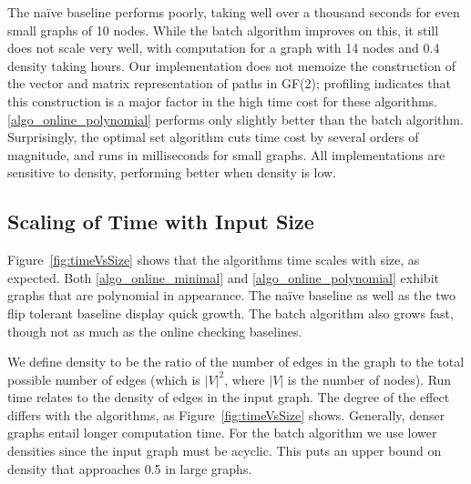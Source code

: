 \documentclass[sigplan,review]{acmart}
\begin{document}
{The na\"{i}ve baseline performs poorly, taking well over a thousand seconds for even small graphs of 10 nodes.
While the batch algorithm improves on this, it still does not scale very well, with computation for a graph with 14 nodes and 0.4 density taking hours.
Our implementation does not memoize the construction of the vector and matrix representation of paths in GF(2); profiling indicates that this construction is a major factor in the high time cost for these algorithms.
\ref{algo_online_polynomial} performs only slightly better than the batch algorithm.
Surprisingly, the optimal set algorithm cuts time cost by several orders of magnitude, and runs in milliseconds for small graphs.
All implementations are sensitive to density, performing better when density is low.
    
\subsection{Scaling of Time with Input Size}

Figure~\ref{fig:timeVsSize} shows that the algorithms time scales with size, as expected.
Both \ref{algo_online_minimal} and \ref{algo_online_polynomial} exhibit graphs that are polynomial in appearance.
The na\"{i}ve baseline as well as the two flip tolerant baseline display quick growth.
The batch algorithm also grows fast, though not as much as the online checking baselines.

We define density to be the ratio of the number of edges in the graph to the total possible number of edges (which is $|V|^2$, where $|V|$ is the number of nodes).
Run time relates to the density of edges in the input graph.
The degree of the effect differs with the algorithms, as Figure~\ref{fig:timeVsSize} shows.
Generally, denser graphs entail longer computation time.
For the batch algorithm we use lower densities since the input graph must be acyclic. This puts an upper bound on density that approaches 0.5 in large graphs.

}
\end{document}
